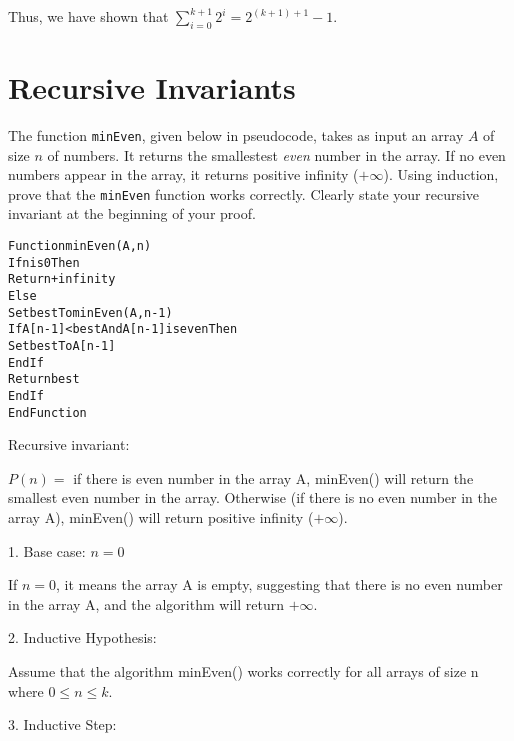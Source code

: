 \documentclass{article}
\begin{document}
      Thus, we have shown that $\sum\limits_{i=0}^{k+1} 2^i = 2^{(k+1)+1} - 1$.


    \vspace{1cm}
    \section{Recursive Invariants}
    
    The function \texttt{minEven}, given below in pseudocode, takes as
    input an array $A$ of size $n$ of numbers.  It returns the
    smallestest \emph{even} number in the array.  If no even numbers
    appear in the array, it returns positive infinity ($+\infty$).
    Using induction, prove that the \texttt{minEven} function works
    correctly.  Clearly state your recursive invariant at the
    beginning of your proof.

    \begin{alltt}
Function minEven(A,n)
  If n is 0 Then
    Return +infinity
  Else
    Set best To minEven(A,n-1)
    If A[n-1] < best And A[n-1] is even Then
      Set best To A[n-1]
    EndIf
    Return best
  EndIf
EndFunction
    \end{alltt}

      Recursive invariant:

      \vspace{1.5mm}
      $P(n) =$ if there is even number in the array A, minEven() will return the smallest 
      even number in the array. Otherwise (if there is no even number in the array A), minEven() 
      will return positive infinity ($+\infty$). 

      \vspace{5mm}
      1. Base case: $n = 0$

      \vspace{1.5mm}
      If $n = 0$, it means the array A is empty, suggesting that there is no even number in the
      array A, and the algorithm will return $+\infty$. 

      \vspace{5mm}
      2. Inductive Hypothesis: 

      \vspace{1.5mm}
      Assume that the algorithm minEven() works correctly for all arrays
      of size n where $0 \leqslant n \leqslant k$.

      \vspace{5mm}
      3. Inductive Step: 
\end{document}
